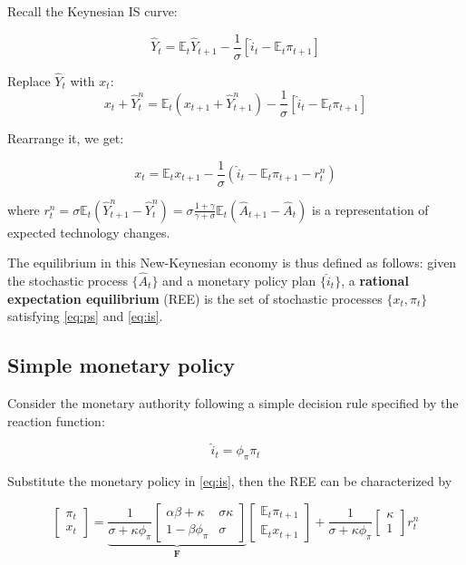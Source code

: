 \documentclass[10pt,a4]{article}
\begin{document}
Recall the Keynesian IS curve:

$$ \hat Y_t = \mathbb{E}_t\hat Y_{t+1} - \frac{1}{\sigma}[\hat i_{t} - \mathbb{E}_t\pi_{t+1}]$$

Replace $\hat Y_t$ with $x_t$:
$$ x_t + \hat Y_t^n = \mathbb{E}_t(x_{t+1}+\hat Y_{t+1}^n) - \frac{1}{\sigma}[\hat i_{t} - \mathbb{E}_t\pi_{t+1}]$$

Rearrange it, we get:

\begin{equation}
\label{eq:is}
x_t = \mathbb{E}_t x_{t+1} - \frac{1}{\sigma}(\hat i_t - \mathbb{E}_t \pi_{t+1} - r_t^n)
\end{equation}

where $r_t^n = \sigma\mathbb{E}_t(\hat Y_{t+1}^n - \hat Y_t^n) = \sigma\frac{1+\gamma}{\gamma+\sigma}\mathbb{E}_t(\hat A_{t+1} - \hat A_t)$ is a representation of expected technology changes. 

The equilibrium in this New-Keynesian economy is thus defined as follows: given the stochastic process $\{\hat A_t\}$ and a monetary policy plan $\{\hat i_t\}$, a \textbf{rational expectation equilibrium} (REE) is the set of stochastic processes $\{x_t, \pi_t\}$ satisfying \eqref{eq:ps} and \eqref{eq:is}.

\subsection{Simple monetary policy}

{\label{773166}}

Consider the monetary authority following a simple decision rule
specified by the reaction function:

$$ \hat i_t =\phi_\pi \pi_t $$

Substitute the monetary policy in \eqref{eq:is}, then the REE can be characterized by

\[
\begin{bmatrix}
\pi_t \\
x_t
\end{bmatrix}
=
\underbrace{
\frac{1}{\sigma+\kappa\phi_\pi}
\begin{bmatrix}
\alpha\beta+\kappa & \sigma\kappa \\
1-\beta\phi_\pi & \sigma 
\end{bmatrix}
}_{\mathbf F}
\begin{bmatrix}
\mathbb{E}_t \pi_{t+1} \\
\mathbb{E}_t x_{t+1}
\end{bmatrix}
+ \frac{1}{\sigma+\kappa\phi_\pi}
\begin{bmatrix}
\kappa \\ 1
\end{bmatrix}
r_t^n
\]
\end{document}
